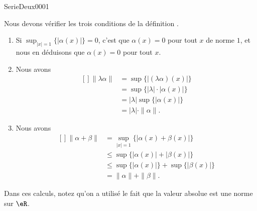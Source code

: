 
\begin{corrige}{SerieDeux0001}

	Nous devons vérifier les trois conditions de la définition \pageref{DefOYPooZIoWnI}.
	\begin{enumerate}

		\item
			Si $\sup_{| x |=1}\{ |\alpha(x)| \}=0$, c'est que $\alpha(x)=0$ pour tout $x$ de norme $1$, et nous en déduisons que $\alpha(x)=0$ pour tout $x$.
		\item
			Nous avons
			\begin{equation}
				\begin{aligned}[]
					\| \lambda\alpha \|&=\sup\{ | (\lambda\alpha)(x) | \}\\
					&=\sup\{ | \lambda |\cdot| \alpha(x) | \}\\
					&=| \lambda |\sup\{ | \alpha(x) | \}\\
					&=| \lambda |\cdot\| \alpha \|.
				\end{aligned}
			\end{equation}
		\item
			Nous avons
			\begin{equation}
				\begin{aligned}[]
					\| \alpha+\beta \|&=\sup_{| x |=1}\{ | \alpha(x)+\beta(x) | \}\\
					&\leq\sup \{ | \alpha(x) |+| \beta(x) | \}\\
					&\leq \sup\{ | \alpha(x) | \}+\sup\{ | \beta(x) | \}\\
					&=\| \alpha \|+\| \beta \|.
				\end{aligned}
			\end{equation}

	\end{enumerate}
	Dans ces calculs, notez qu'on a utilisé le fait que la valeur absolue est une norme sur $\eR$.

\end{corrige}
